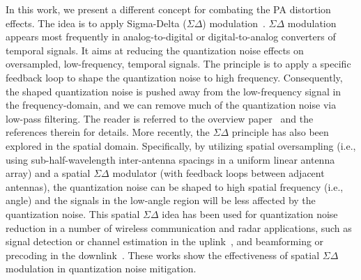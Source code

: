 \documentclass[10pt,twocolumn,twoside]{IEEEtran}
\begin{document}
In this work,
we present a different concept for combating the PA distortion effects.
The idea is to apply Sigma-Delta ($\Sigma \Delta$) modulation~\cite{aziz1996overview}.
$\Sigma \Delta$ modulation appears most frequently in analog-to-digital or digital-to-analog converters of temporal signals.
It aims at reducing the quantization noise effects on oversampled, low-frequency, temporal signals.
The principle is to apply a specific feedback loop to shape the quantization noise to high frequency.
Consequently, the shaped quantization noise is pushed away from the low-frequency signal in the frequency-domain, and we can remove much of the quantization noise via low-pass filtering.
The reader is referred to the overview paper~\cite{aziz1996overview} and the references therein for details.
More recently, the $\Sigma \Delta$ principle has also been explored in the spatial domain.
Specifically, by utilizing spatial oversampling (i.e., using sub-half-wavelength inter-antenna spacings in a uniform linear antenna array) and a spatial $\Sigma \Delta$ modulator (with feedback loops between adjacent antennas), the quantization noise can be shaped to high spatial frequency (i.e., angle) and the signals in the low-angle region will be less affected by the quantization noise.
This spatial $\Sigma \Delta$ idea has been used for quantization noise reduction in a number of  wireless communication and radar applications, such as
signal detection or channel estimation in the uplink~\cite{corey2016spatial,barac2016spatial,nikoofard2017low,madanayake2017improving,rao2019massive,pirzadeh2020spectral,rao2021massive}, and  beamforming or precoding in the downlink~\cite{scholnik2004spatio,krieger2013dense,shao2019one,shao2020multiuser}.
These works show the effectiveness of spatial $\Sigma\Delta$ modulation in quantization noise mitigation.
\end{document}
